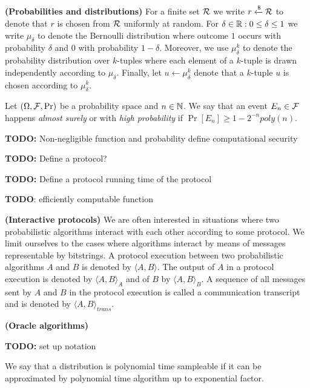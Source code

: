 \textbf{(Probabilities and distributions)}
For a finite set $\mathcal{R}$ we write $r \xleftarrow{\$} \mathcal{R}$ to denote that $r$ is chosen from $\mathcal{R}$ uniformly at random.
For $\delta \in \mathbb{R} : 0 \leq \delta \leq 1$ we write $\mu_{\delta}$ to denote the Bernoulli distribution where outcome $1$ occurs with
probability $\delta$ and $0$ with probability $1-\delta$.
Moreover, we use $\mu_{\delta}^k$ to denote the probability distribution over $k$-tuples
where each element of a $k$-tuple is drawn independently according to $\mu_{\delta}$.
Finally, let $u \leftarrow \mu_{\delta}^k$ denote that a $k$-tuple $u$ is chosen according to $\mu_{\delta}^k$.

Let $(\Omega, \mathcal{F}, \Pr)$ be a probability space and $n \in \mathbb{N}$. We say that an event $E_n \in \mathcal{F}$
happens \textit{almost surely} or with \textit{high probability} if $\Pr[E_n] \geq 1 - 2^{-n} \mathit{poly}(n)$.

\begin{todo}
  \textbf{TODO:} Non-negligible function and probability
define computational security
\end{todo}
\begin{todo}
  \textbf{TODO:} Define a protocol?
\end{todo}
\begin{todo}
  \textbf{TODO:} Define a protocol running time of the protocol
\end{todo}
\begin{todo}
 \textbf{TODO}: efficiently computable function
\end{todo}

\textbf{(Interactive protocols)} We are often interested in situations where two probabilistic algorithms interact with each other according to some protocol.
We limit ourselves to the cases where algorithms interact by means of messages representable by bitstrings.
A protocol execution between two probabilistic algorithms $A$ and $B$ is denoted by $\langle A, B \rangle$.
The output of $A$ in a protocol execution is denoted by $\langle A, B \rangle_A$ and of $B$ by $\langle A, B \rangle_B$.
A sequence of all messages sent by $A$ and $B$ in the protocol execution is called a communication transcript and
is denoted by $\langle A, B \rangle_{\mathit{trans}}$.

\textbf{(Oracle algorithms)}
\begin{todo}
  \textbf{TODO:} set up notation
\end{todo}

\begin{definition}
We say that a distribution is polynomial time sampleable if it can be approximated by polynomial time algorithm
up to exponential factor.
\end{definition}


